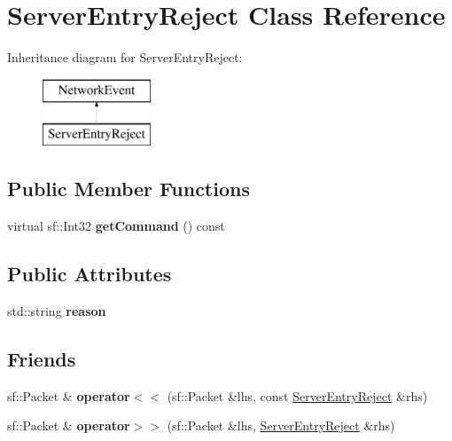\hypertarget{class_server_entry_reject}{\section{Server\-Entry\-Reject Class Reference}
\label{class_server_entry_reject}
}
Inheritance diagram for Server\-Entry\-Reject\-:\begin{figure}[H]
\begin{center}
\leavevmode
\includegraphics[height=2.000000cm]{class_server_entry_reject}
\end{center}
\end{figure}
\subsection*{Public Member Functions}
\begin{DoxyCompactItemize}
\item 
\hypertarget{class_server_entry_reject_abd4bfbe4de9bd3aabf854719d3cb8e8a}{virtual sf\-::\-Int32 {\bfseries get\-Command} () const }\label{class_server_entry_reject_abd4bfbe4de9bd3aabf854719d3cb8e8a}

\end{DoxyCompactItemize}
\subsection*{Public Attributes}
\begin{DoxyCompactItemize}
\item 
\hypertarget{class_server_entry_reject_ab0963f90b7e8c8f77b152b2540512a15}{std\-::string {\bfseries reason}}\label{class_server_entry_reject_ab0963f90b7e8c8f77b152b2540512a15}

\end{DoxyCompactItemize}
\subsection*{Friends}
\begin{DoxyCompactItemize}
\item 
\hypertarget{class_server_entry_reject_adde98b351cddfab0a69f39e7928f72b5}{sf\-::\-Packet \& {\bfseries operator$<$$<$} (sf\-::\-Packet \&lhs, const \hyperlink{class_server_entry_reject}{Server\-Entry\-Reject} \&rhs)}\label{class_server_entry_reject_adde98b351cddfab0a69f39e7928f72b5}

\item 
\hypertarget{class_server_entry_reject_aa17dcc33d7bcb214f3ee597ac8119bb8}{sf\-::\-Packet \& {\bfseries operator$>$$>$} (sf\-::\-Packet \&lhs, \hyperlink{class_server_entry_reject}{Server\-Entry\-Reject} \&rhs)}\label{class_server_entry_reject_aa17dcc33d7bcb214f3ee597ac8119bb8}

\end{DoxyCompactItemize}
